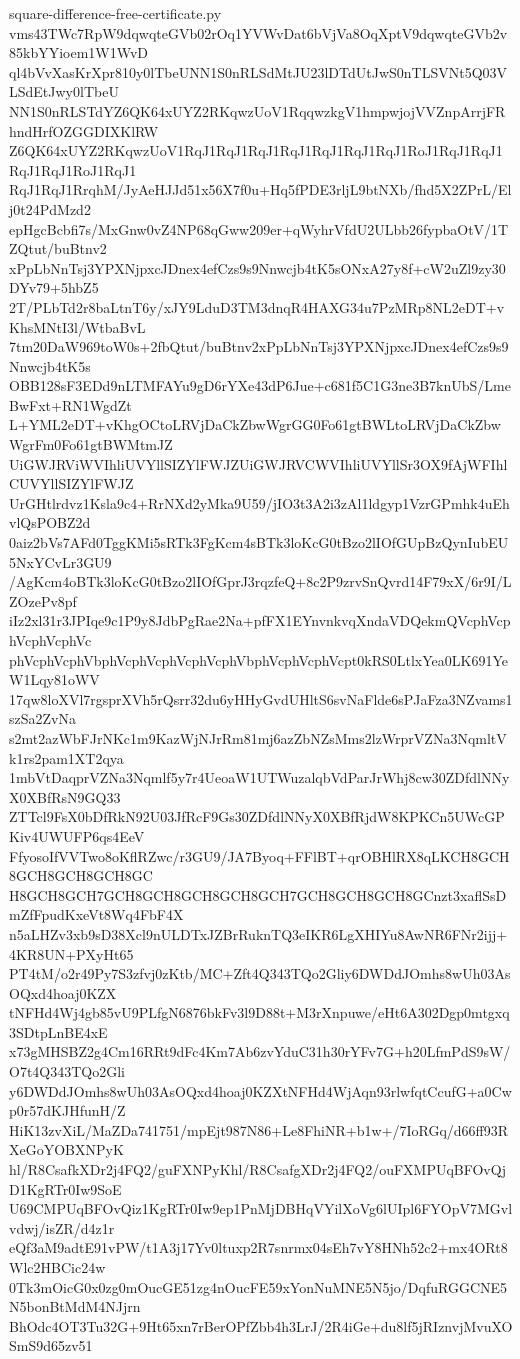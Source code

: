 \documentclass[11pt]{article}
\theoremstyle{definition}
\theoremstyle{remark}
\begin{document}
\begin{filecontents*}[overwrite]{square-difference-free-certificate.py}
vms43TWc7RpW9dqwqteGVb02rOq1YVWvDat6bVjVa8OqXptV9dqwqteGVb2v85kbYYioem1W1WvD
ql4bVvXasKrXpr810y0lTbeUNN1S0nRLSdMtJU23lDTdUtJwS0nTLSVNt5Q03VLSdEtJwy0lTbeU
NN1S0nRLSTdYZ6QK64xUYZ2RKqwzUoV1RqqwzkgV1hmpwjojVVZnpArrjFRhndHrfOZGGDIXKlRW
Z6QK64xUYZ2RKqwzUoV1RqJ1RqJ1RqJ1RqJ1RqJ1RqJ1RqJ1RoJ1RqJ1RqJ1RqJ1RqJ1RoJ1RqJ1
RqJ1RqJ1RrqhM/JyAeHJJd51x56X7f0u+Hq5fPDE3rljL9btNXb/fhd5X2ZPrL/Elj0t24PdMzd2
epHgcBcbfi7s/MxGnw0vZ4NP68qGww209er+qWyhrVfdU2ULbb26fypbaOtV/1TZQtut/buBtnv2
xPpLbNnTsj3YPXNjpxcJDnex4efCzs9s9Nnwcjb4tK5sONxA27y8f+cW2uZl9zy30DYv79+5hbZ5
2T/PLbTd2r8baLtnT6y/xJY9LduD3TM3dnqR4HAXG34u7PzMRp8NL2eDT+vKhsMNtI3l/WtbaBvL
7tm20DaW969toW0s+2fbQtut/buBtnv2xPpLbNnTsj3YPXNjpxcJDnex4efCzs9s9Nnwcjb4tK5s
OBB128sF3EDd9nLTMFAYu9gD6rYXe43dP6Jue+c681f5C1G3ne3B7knUbS/LmeBwFxt+RN1WgdZt
L+YML2eDT+vKhgOCtoLRVjDaCkZbwWgrGG0Fo61gtBWLtoLRVjDaCkZbwWgrFm0Fo61gtBWMtmJZ
UiGWJRViWVIhliUVYllSIZYlFWJZUiGWJRVCWVIhliUVYllSr3OX9fAjWFIhlCUVYllSIZYlFWJZ
UrGHtlrdvz1Ksla9c4+RrNXd2yMka9U59/jIO3t3A2i3zAl1ldgyp1VzrGPmhk4uEhvlQsPOBZ2d
0aiz2bVs7AFd0TggKMi5sRTk3FgKcm4sBTk3loKcG0tBzo2lIOfGUpBzQynIubEU5NxYCvLr3GU9
/AgKcm4oBTk3loKcG0tBzo2lIOfGprJ3rqzfeQ+8c2P9zrvSnQvrd14F79xX/6r9I/LZOzePv8pf
iIz2xl31r3JPIqe9c1P9y8JdbPgRae2Na+pfFX1EYnvnkvqXndaVDQekmQVcphVcphVcphVcphVc
phVcphVcphVbphVcphVcphVcphVcphVbphVcphVcphVcpt0kRS0LtlxYea0LK691YeW1Lqy81oWV
17qw8loXVl7rgsprXVh5rQsrr32du6yHHyGvdUHltS6svNaFlde6sPJaFza3NZvams1szSa2ZvNa
s2mt2azWbFJrNKc1m9KazWjNJrRm81mj6azZbNZsMms2lzWrprVZNa3NqmltVk1rs2pam1XT2qya
1mbVtDaqprVZNa3Nqmlf5y7r4UeoaW1UTWuzalqbVdParJrWhj8cw30ZDfdlNNyX0XBfRsN9GQ33
ZTTcl9FsX0bDfRkN92U03JfRcF9Gs30ZDfdlNNyX0XBfRjdW8KPKCn5UWcGPKiv4UWUFP6qs4EeV
FfyosoIfVVTwo8oKflRZwc/r3GU9/JA7Byoq+FFlBT+qrOBHlRX8qLKCH8GCH8GCH8GCH8GCH8GC
H8GCH8GCH7GCH8GCH8GCH8GCH8GCH7GCH8GCH8GCH8GCnzt3xaflSsDmZfFpudKxeVt8Wq4FbF4X
n5aLHZv3xb9sD38Xcl9nULDTxJZBrRuknTQ3eIKR6LgXHIYu8AwNR6FNr2ijj+4KR8UN+PXyHt65
PT4tM/o2r49Py7S3zfvj0zKtb/MC+Zft4Q343TQo2Gliy6DWDdJOmhs8wUh03AsOQxd4hoaj0KZX
tNFHd4Wj4gb85vU9PLfgN6876bkFv3l9D88t+M3rXnpuwe/eHt6A302Dgp0mtgxq3SDtpLnBE4xE
x73gMHSBZ2g4Cm16RRt9dFc4Km7Ab6zvYduC31h30rYFv7G+h20LfmPdS9sW/O7t4Q343TQo2Gli
y6DWDdJOmhs8wUh03AsOQxd4hoaj0KZXtNFHd4WjAqn93rlwfqtCcufG+a0Cwp0r57dKJHfunH/Z
HiK13zvXiL/MaZDa741751/mpEjt987N86+Le8FhiNR+b1w+/7IoRGq/d66ff93RXeGoYOBXNPyK
hl/R8CsafkXDr2j4FQ2/guFXNPyKhl/R8CsafgXDr2j4FQ2/ouFXMPUqBFOvQjD1KgRTr0Iw9SoE
U69CMPUqBFOvQiz1KgRTr0Iw9ep1PnMjDBHqVYilXoVg6lUIpl6FYOpV7MGvlvdwj/isZR/d4z1r
eQf3aM9adtE91vPW/t1A3j17Yv0ltuxp2R7snrmx04sEh7vY8HNh52c2+mx4ORt8Wlc2HBCic24w
0Tk3mOicG0x0zg0mOucGE51zg4nOucFE59xYonNuMNE5N5jo/DqfuRGGCNE5N5bonBtMdM4NJjrn
BhOdc4OT3Tu32G+9Ht65xn7rBerOPfZbb4h3LrJ/2R4iGe+du8lf5jRIznvjMvuXOSmS9d65zv51

\end{filecontents*}
\end{document}
